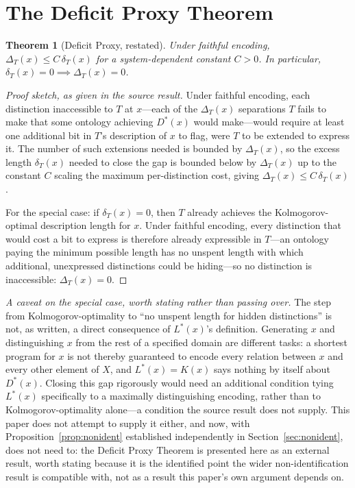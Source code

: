\documentclass[11pt]{article}
\theoremstyle{plain}
\newtheorem{theorem}{Theorem}
\begin{document}
\section{The Deficit Proxy Theorem}
\label{app:proxy-theorem}

\begin{theorem}[Deficit Proxy, restated]
Under faithful encoding, $\Delta_T(x) \le C\,\delta_T(x)$ for a system-dependent constant $C > 0$. In particular, $\delta_T(x) = 0 \implies \Delta_T(x) = 0$.
\end{theorem}

\begin{proof}[Proof sketch, as given in the source result]
Under faithful encoding, each distinction inaccessible to $T$ at $x$---each of the $\Delta_T(x)$ separations $T$ fails to make that some ontology achieving $D^*(x)$ would make---would require at least one additional bit in $T$'s description of $x$ to flag, were $T$ to be extended to express it. The number of such extensions needed is bounded by $\Delta_T(x)$, so the excess length $\delta_T(x)$ needed to close the gap is bounded below by $\Delta_T(x)$ up to the constant $C$ scaling the maximum per-distinction cost, giving $\Delta_T(x) \le C\,\delta_T(x)$.

For the special case: if $\delta_T(x) = 0$, then $T$ already achieves the Kolmogorov-optimal description length for $x$. Under faithful encoding, every distinction that would cost a bit to express is therefore already expressible in $T$---an ontology paying the minimum possible length has no unspent length with which additional, unexpressed distinctions could be hiding---so no distinction is inaccessible: $\Delta_T(x) = 0$.
\end{proof}

\emph{A caveat on the special case, worth stating rather than passing over.} The step from Kolmogorov-optimality to ``no unspent length for hidden distinctions'' is not, as written, a direct consequence of $L^*(x)$'s definition. Generating $x$ and distinguishing $x$ from the rest of a specified domain are different tasks: a shortest program for $x$ is not thereby guaranteed to encode every relation between $x$ and every other element of $X$, and $L^*(x) = K(x)$ says nothing by itself about $D^*(x)$. Closing this gap rigorously would need an additional condition tying $L^*(x)$ specifically to a maximally distinguishing encoding, rather than to Kolmogorov-optimality alone---a condition the source result does not supply. This paper does not attempt to supply it either, and now, with Proposition~\ref{prop:nonident} established independently in Section~\ref{sec:nonident}, does not need to: the Deficit Proxy Theorem is presented here as an external result, worth stating because it is the identified point the wider non-identification result is compatible with, not as a result this paper's own argument depends on.
\end{document}
